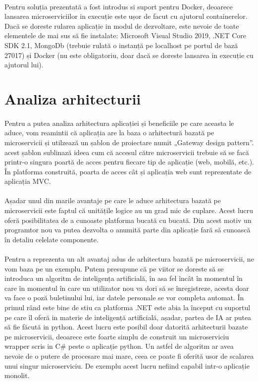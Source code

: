 \documentclass[12pt]{report}
\begin{document}
	\paragraph{}Pentru soluția prezentată a fost introdus si suport pentru Docker, deoarece lansarea microserviciilor in execuție este ușor de facut cu ajutorul containerelor. Dacă se doreste rularea aplicație in modul de dezvoltare, este nevoie de toate elementele de mai sus să fie instalate: Microsoft Visual Studio 2019, .NET Core SDK 2.1, MongoDb (trebuie rulată o instanță pe localhost pe portul de bază 27017) și Docker (nu este obligatoriu, doar dacă se doreste lansarea in execuție cu ajutorul lui).
  	\section{Analiza arhitecturii}
  	\paragraph{}Pentru a putea analiza arhitectura aplicației și beneficiile pe care aceasta le aduce, vom reamintii că aplicația are la baza o arhitectură bazată pe microservicii și utilzează un șablon de proiectare numit „Gateway design pattern”. acest șablon sublinază ideea cum că accesul către microservicii trebuie să se facă printr-o singura poartă de acces pentru fiecare tip de aplicație (web, mobilă, etc.). În platforma construită, poarta de acces cât și aplicația web sunt reprezentate de aplicația MVC.
  	\paragraph{}Așadar unul din marile avantaje pe care le aduce arhitectura bazată pe microservicii este faptul că unitățile logice au un grad mic de cuplare. Acest lucru oferă posibilitatea de a cunoaste platforma bucată cu bucată. Din acest motiv un programtor nou va putea dezvolta o anumită parte din aplicație fară să cunoască în detaliu celelate componente.
  	\paragraph{}Pentru a reprezenta un alt avantaj adus de arhitectura bazată pe microservicii, ne vom baza pe un exemplu. Putem presupune că pe viitor se doreste să se introduca un algoritm de inteligența artificială, în asa fel încât în momentul în care în momentul în care un utilizator nou va dori să se înregistreze, acesta doar va face o poză buletinului lui, iar datele personale se vor completa automat. În primul rând este bine de stiu ca platforma .NET este abia la început cu suportul pe care îl oferă in materie de inteligență artificială, așadar, partea de IA ar putea să fie făcută in python. Acest lucru este posibil doar datorită arhitecturii bazate pe microservicii, deoarece este foarte simplu de construit un microserviciu wrapper scris in C\# peste o aplicație python. Un astfel de algoritm ar avea nevoie de o putere de procesare mai mare, ceea ce poate fi oferită usor de scalarea unui singur microserviciu. De exemplu acest lucru nefiind capabil intr-o aplicație monolit. 
\end{document}
